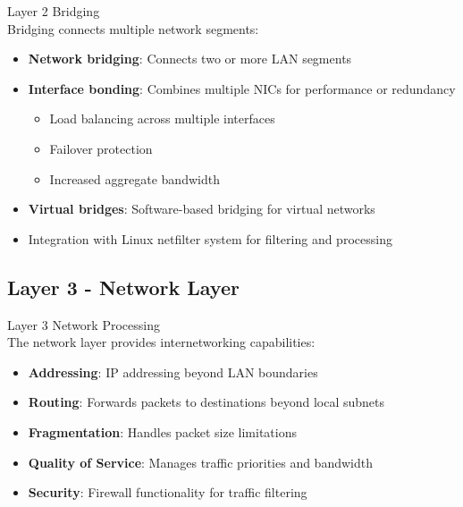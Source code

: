 \begin{definition}{Layer 2 Bridging}\\
    Bridging connects multiple network segments:
    \begin{itemize}
        \item \textbf{Network bridging}: Connects two or more LAN segments
        \item \textbf{Interface bonding}: Combines multiple NICs for performance or redundancy
            \begin{itemize}
                \item Load balancing across multiple interfaces
                \item Failover protection
                \item Increased aggregate bandwidth
            \end{itemize}
        \item \textbf{Virtual bridges}: Software-based bridging for virtual networks
        \item Integration with Linux netfilter system for filtering and processing
    \end{itemize}
\end{definition}

\subsection{Layer 3 - Network Layer}

\begin{definition}{Layer 3 Network Processing}\\
    The network layer provides internetworking capabilities:
    \begin{itemize}
        \item \textbf{Addressing}: IP addressing beyond LAN boundaries
        \item \textbf{Routing}: Forwards packets to destinations beyond local subnets
        \item \textbf{Fragmentation}: Handles packet size limitations
        \item \textbf{Quality of Service}: Manages traffic priorities and bandwidth
        \item \textbf{Security}: Firewall functionality for traffic filtering
    \end{itemize}
\end{definition}

